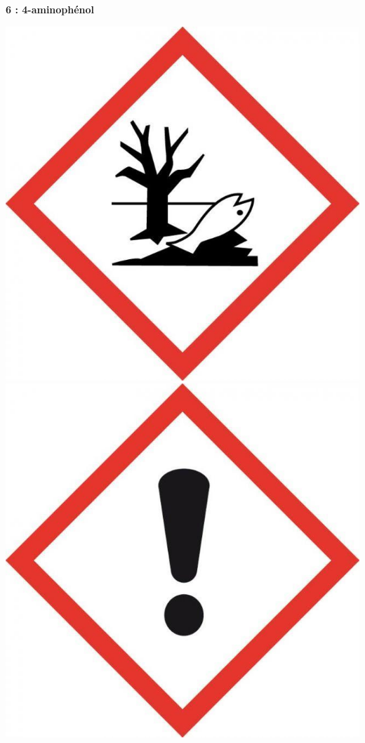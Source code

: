 \documentclass[12pt,a4paper]{article}
\begin{document}
\begin{multicols}{2}

\begin{doc}
\textbf{6 : 4-aminophénol}

\begin{center}
\includegraphics[scale=0.05]{images/pict_aquatique.jpg}
\includegraphics[scale=0.05]{images/pict_nocif.jpg}

\end{center}
\end{doc}
\end{multicols}
\end{document}

